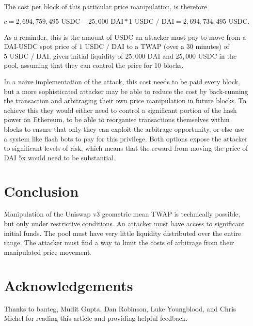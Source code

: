 \documentclass[a4paper, 11pt]{article}
\begin{document}
The cost per block of this particular price manipulation, is therefore 

\begin{equation}
c
=
2,694,759,495 \text{ USDC}
- 
25,000 \text{ DAI} * 1 \text{ USDC } /\text{ DAI}
=
2,694,734,495 \text{ USDC}.
\end{equation}

As a reminder, this is the amount of USDC an attacker must pay to move from a DAI-USDC spot price of $1 \text{ USDC } /\text{ DAI}$ to a TWAP (over a 30 minutes) of $5 \text{ USDC } /\text{ DAI}$, given initial liquidity of $25,000 \text{ DAI}$ and $25,000 \text{ USDC}$ in the pool, assuming that they can control the price for 10 blocks.

In a naive implementation of the attack, this cost needs to be paid every block, but a more sophisticated attacker may be able to reduce the cost by back-running the transaction and arbitraging their own price manipulation in future blocks. To achieve this they would either need to control a significant portion of the hash power on Ethereum, to be able to reorganise transactions themselves within blocks to ensure that only they can exploit the arbitrage opportunity, or else use a system like flash bots to pay for this privilege. Both options expose the attacker to significant levels of risk, which means that the reward from moving the price of DAI 5x would need to be substantial. 

\section{Conclusion}

Manipulation of the Uniswap v3 geometric mean TWAP is technically possible, but only under restrictive conditions. An attacker must have access to significant initial funds. The pool must have very little liquidity distributed over the entire range. The attacker must find a way to limit the costs of arbitrage from their manipulated price movement. 

\section{Acknowledgements}

Thanks to banteg, Mudit Gupta, Dan Robinson, Luke Youngblood, and Chris Michel for reading this article and providing helpful feedback. 
\end{document}
